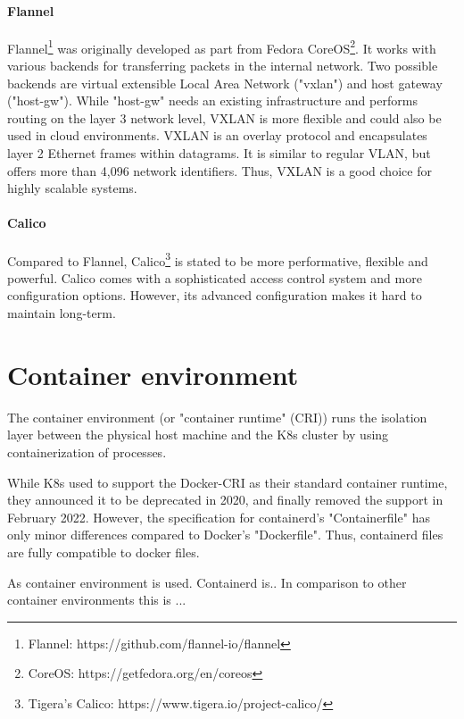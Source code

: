 \paragraph{Flannel}
Flannel\footnote{Flannel: https://github.com/flannel-io/flannel} was originally developed as part from Fedora CoreOS\footnote{CoreOS: https://getfedora.org/en/coreos}\cite{SuseRancherCommunity.20230212}. It works with various backends for transferring packets in the internal network. Two possible backends are virtual extensible Local Area Network ("vxlan") and host gateway ("host-gw"). While "host-gw" needs an existing infrastructure and performs routing on the layer 3 network level, VXLAN is more flexible and could also be used in cloud environments\cite{GitHubFlannel.io.20230212}. VXLAN is an overlay protocol and encapsulates layer 2 Ethernet frames within datagrams\cite{SuseRancherCommunity.20230212}. It is similar to regular VLAN, but offers more than 4,096 network identifiers\cite{SuseRancherCommunity.20230212}. Thus, VXLAN is a good choice for highly scalable systems.

\paragraph{Calico}
Compared to Flannel, Calico\footnote{Tigera's Calico: https://www.tigera.io/project-calico/} is stated to be more performative, flexible and powerful\cite{SuseRancherCommunity.20230212,Tigera.20230210}. Calico comes with a sophisticated access control system\cite{Tigera.20230210} and more configuration options. However, its advanced configuration makes it hard to maintain long-term.

\section{Container environment}
The container environment (or "container runtime" (CRI)) runs the isolation layer between the physical host machine and the \ac{K8s} cluster by using containerization of processes.

While \ac{K8s} used to support the Docker-CRI as their standard container runtime, they announced it to be deprecated in 2020, and finally removed the support in February 2022\cite{Kubernetes.2020}. 
However, the specification for containerd's "Containerfile" has only minor differences compared to Docker's "Dockerfile". Thus, containerd files are fully compatible to docker files.

As container environment  is used. Containerd is..
In comparison to other container environments this is ...

